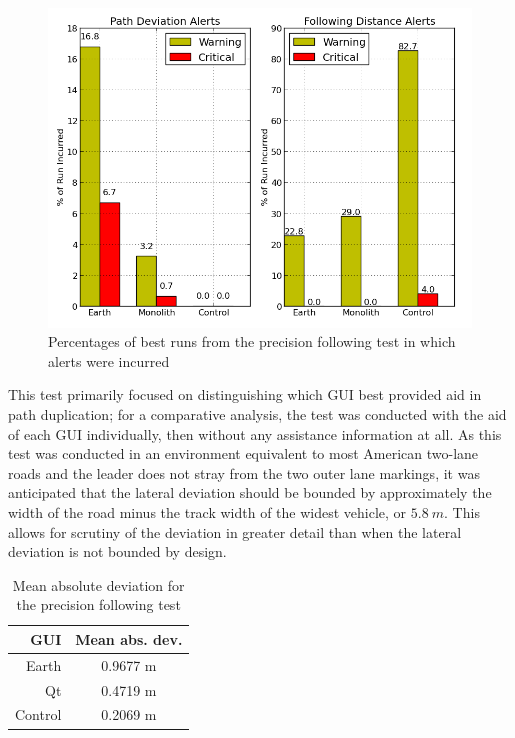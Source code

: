 \documentclass[twocolumn,10pt]{article}
\begin{document}
    \begin{figure}[ht] \centering
      \includegraphics[width=\columnwidth]{../graphics/precision_following_alert_percents.png}
      \caption{Percentages of best runs from the precision following test in which alerts were incurred}
      \label{fig:precision_following_alert_percents}
    \end{figure}

    This test primarily focused on distinguishing which GUI best provided aid in path duplication; for a comparative analysis, the test was conducted with the aid of each GUI individually, then without any assistance information at all.  As this test was conducted in an environment equivalent to most American two-lane roads and the leader does not stray from the two outer lane markings, it was anticipated that the lateral deviation should be bounded by approximately the width of the road minus the track width of the widest vehicle, or $5.8~m$.  This allows for scrutiny of the deviation in greater detail than when the lateral deviation is not bounded by design.

    \begin{table}[htbp] \centering \caption{Mean absolute deviation for the precision following test}
    \begin{tabular}{r|c} 
        GUI&    Mean abs. dev. \\ \hline\hline
        Earth&      0.9677 m \\
        Qt&   0.4719 m \\
        Control&    0.2069 m \\ \hline   
    \end{tabular} \label{tab:precision_dev_mean} \end{table}
\end{document}
